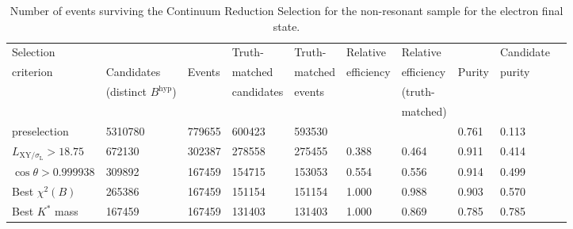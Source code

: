 
\begin{table}[!ht] 
    \caption{Number of events surviving the Continuum Reduction Selection for the non-resonant sample for the electron final state.} 
    \centering 
    \hspace*{-0.6cm}
    {\small
    \begin{tabular}{l | l l l l l l l l l } 
    \hline\hline
    Selection &             &        & Truth- & Truth- & Relative & Relative &  &  Candidate\\
    criterion & Candidates  & Events & matched & matched & efficiency & efficiency & Purity & purity\\
              &   (distinct $B^{\mathrm{hyp}}$)          &        & candidates & events &          & (truth- & &\\
              &              &        &   &   &          & matched) & & \\          
    \hline
    preselection& 5310780& 779655& 600423& 593530&&& 0.761& 0.113\\
    \hline
    $L_{\mathrm{XY}/\sigma_{\mathrm{L}}} > 18.75$& 672130& 302387& 278558& 275455& 0.388& 0.464& 0.911& 0.414\\
    $\cos \theta > 0.999938$& 309892& 167459& 154715& 153053& 0.554& 0.556& 0.914& 0.499\\
    Best $\chi^{2}(B)$& 265386& 167459& 151154& 151154& 1.000& 0.988& 0.903& 0.570\\
    Best $K^{*}$ mass& 167459& 167459& 131403& 131403& 1.000& 0.869& 0.785& 0.785\\
    
    \hline\hline
    \end{tabular} 
    }
    \label{tab:CRS_NR}
\end{table}

